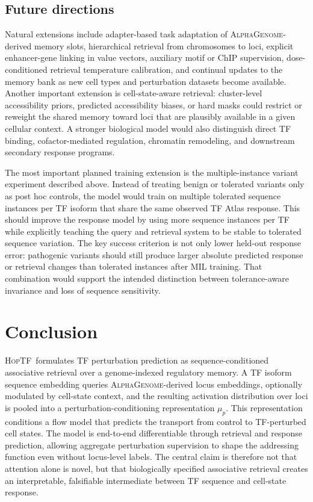 \documentclass[11pt]{article}
\newcommand{\hoptf}{\textsc{HopTF}}
\newcommand{\ag}{\textsc{AlphaGenome}}
\begin{document}
\subsection{Future directions}

Natural extensions include adapter-based task adaptation of \ag-derived memory slots, hierarchical retrieval from chromosomes to loci, explicit enhancer-gene linking in value vectors, auxiliary motif or ChIP supervision, dose-conditioned retrieval temperature calibration, and continual updates to the memory bank as new cell types and perturbation datasets become available. Another important extension is cell-state-aware retrieval: cluster-level accessibility priors, predicted accessibility biases, or hard masks could restrict or reweight the shared memory toward loci that are plausibly available in a given cellular context. A stronger biological model would also distinguish direct TF binding, cofactor-mediated regulation, chromatin remodeling, and downstream secondary response programs.

The most important planned training extension is the multiple-instance variant experiment described above. Instead of treating benign or tolerated variants only as post hoc controls, the model would train on multiple tolerated sequence instances per TF isoform that share the same observed TF Atlas response. This should improve the response model by using more sequence instances per TF while explicitly teaching the query and retrieval system to be stable to tolerated sequence variation. The key success criterion is not only lower held-out response error: pathogenic variants should still produce larger absolute predicted response or retrieval changes than tolerated instances after MIL training. That combination would support the intended distinction between tolerance-aware invariance and loss of sequence sensitivity.

\section{Conclusion}

\hoptf\ formulates TF perturbation prediction as sequence-conditioned associative retrieval over a genome-indexed regulatory memory. A TF isoform sequence embedding queries \ag-derived locus embeddings, optionally modulated by cell-state context, and the resulting activation distribution over loci is pooled into a perturbation-conditioning representation \(\mu_p\). This representation conditions a flow model that predicts the transport from control to TF-perturbed cell states. The model is end-to-end differentiable through retrieval and response prediction, allowing aggregate perturbation supervision to shape the addressing function even without locus-level labels. The central claim is therefore not that attention alone is novel, but that biologically specified associative retrieval creates an interpretable, falsifiable intermediate between TF sequence and cell-state response.
\end{document}
